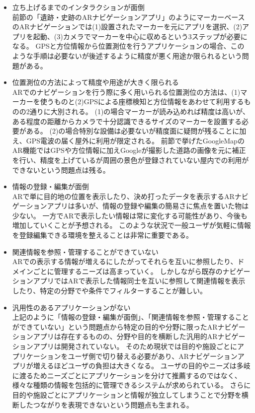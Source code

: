 \begin{itemize}
  \item 立ち上げるまでのインタラクションが面倒\\
    前節の「遺跡・史跡のARナビゲーションアプリ」のようにマーカーベースのARナビゲーションでは(1)設置されたマーカーを元にアプリを選択、(2)アプリを起動、(3)カメラでマーカーを中心に収めるという3ステップが必要になる。
    GPSと方位情報から位置測位を行うアプリケーションの場合、このような手順は必要ないが後述するように精度が悪く用途か限られるという問題がある。
  \item 位置測位の方法によって精度や用途が大きく限られる\\
    ARでのナビゲーションを行う際に多く用いられる位置測位の方法は、(1)マーカーを使うものと(2)GPSによる座標検知と方位情報をあわせて利用するものの2通りに大別される。
    (1)の場合マーカーが読み込めれば精度は高いが、ある程度の距離からカメラで十分認識できるサイズのマーカーを設置する必要がある。
    (2)の場合特別な設備は必要ないが精度面に疑問が残ることに加え、GPS電波の届く屋外に利用が限定される。
    前節で挙げたGoogleMapのAR機能ではGPSや方位情報に加えGoogleが撮影した道路の画像を元に補正を行い、精度を上げているが周囲の景色が登録されていない屋内での利用ができないという問題点は残る。
  \item 情報の登録・編集が面倒\\
    ARで単に目的地の位置を表示したり、決め打ったデータを表示するARナビゲーションアプリは多いが、情報の登録や編集の簡易さに焦点を置いた物は少ない。
    一方でARで表示したい情報は常に変化する可能性があり、今後も増加していくことが予想される。
    このような状況で一般ユーザが気軽に情報を登録編集できる環境を整えることは非常に重要である。
  \item 関連情報を参照・管理することができていない\\
    ARでの表示する情報が増えるにしたがってそれらを互いに参照したり、ドメインごとに管理するニーズは高まっていく。
    しかしながら既存のナビゲーションアプリではARで表示した情報同士を互いに参照して関連情報を表示したり、特定の分野でや条件でフィルターすることが難しい。
  \item 汎用性のあるアプリケーションがない\\
    上記のように「情報の登録・編集が面倒」、「関連情報を参照・管理することができていない」という問題点から特定の目的や分野に限ったARナビゲーションアプリは存在するものの、分野や目的を横断した汎用的ARナビゲーションアプリは開発されていない。
    そのため現状では目的や施設ごとにアプリケーションをユーザ側で切り替える必要があり、ARナビゲーションアプリが増えるほどユーザの負担は大きくなる。
    ユーザの目的やニーズは多岐に渡るためニーズごとにアプリケーションを分けて推薦するのではなく、様々な種類の情報を包括的に管理できるシステムが求められている。
    さらに目的や施設ごとにアプリケーションと情報が独立してしまうことで分野を横断したつながりを表現できないという問題点も生まれる。
\end{itemize}



